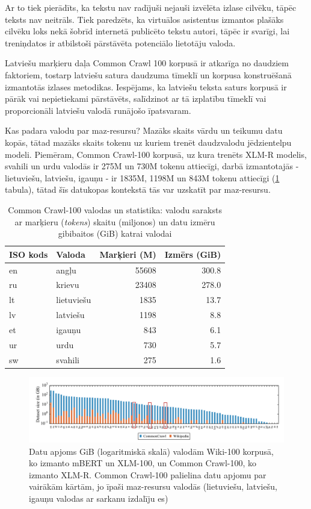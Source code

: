 Ar to tiek pierādīts, ka tekstu nav radījuši nejauši izvēlēta izlase cilvēku, tāpēc teksts nav neitrāls. Tiek paredzēts, ka virtuālos asistentus izmantos plašāks cilvēku loks nekā šobrīd internetā publicēto tekstu autori, tāpēc ir svarīgi, lai treniņdatos ir atbilstoši pārstāvēta potenciālo lietotāju valoda. 


Latviešu marķieru daļa Common Crawl 100 korpusā ir atkarīga no daudziem faktoriem, tostarp latviešu satura daudzuma tīmeklī un korpusa konstruēšanā izmantotās izlases metodikas. Iespējams, ka latviešu teksta saturs korpusā ir pārāk vai nepietiekami pārstāvēts, salīdzinot ar tā izplatību tīmeklī vai proporcionāli latviešu valodā runājošo īpatsvaram.


Kas padara valodu par maz-resursu? Mazāks skaits vārdu un teikumu datu kopās, tātad mazāks skaits tokenu uz kuriem trenēt daudzvalodu jēdzientelpu modeli. Piemēram, Common Crawl-100 korpusā, uz kura trenēts XLM-R modelis, svahili un urdu valodās ir 275M un 730M tokenu attiecīgi, darbā izmantotajās - lietuviešu, latviešu, igauņu - ir 1835M, 1198M un 843M tokenu attiecīgi (\ref{tab:cc-100} tabula), tātad šīs datukopas kontekstā tās var uzskatīt par maz-resursu. 


\begin{table}[htbp]
  \centering
  \caption{Common Crawl-100 valodas un statistika: valodu saraksts ar marķieru (\textit{tokens}) skaitu (miljonos) un datu izmēru gibibaitos (GiB) katrai valodai}
    \begin{tabular}{llrr} \toprule
    ISO kods &  Valoda & Marķieri (M) & Izmērs (GiB) \\\midrule
    en    &  angļu & 55608 & 300.8 \\
    ru    &  krievu & 23408 & 278.0 \\
    lt    &  lietuviešu & 1835  & 13.7 \\
    lv    &  latviešu & 1198  & 8.8 \\
    et    &  igauņu & 843   & 6.1 \\
    ur    &  urdu & 730   & 5.7 \\
    sw    &  svahili & 275   & 1.6 \\\bottomrule
    \end{tabular}
  \label{tab:cc-100}
\end{table}

\begin{figure}[h]
  \centering
  \includegraphics[width=\textwidth]{figures/dataset-size.png}
  \caption{Datu apjoms GiB (logaritmiskā skalā) valodām Wiki-100 korpusā, ko izmanto mBERT un XLM-100, un Common Crawl-100, ko izmanto XLM-R. Common Crawl-100 palielina datu apjomu par vairākām kārtām, jo īpaši maz-resursu valodās (lietuviešu, latviešu, igauņu valodas ar sarkanu izdalīju es) \cite{conneau2020}}
  \label{fig:dataset-size}
\end{figure}
